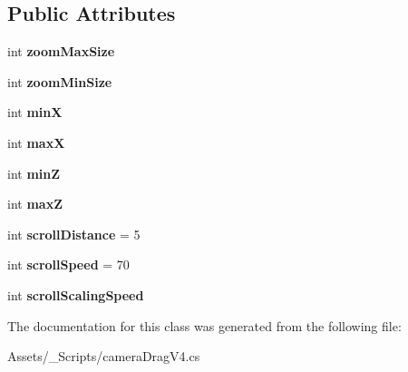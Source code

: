 \subsection*{Public Attributes}
\begin{DoxyCompactItemize}
\item 
\hypertarget{classcamera_drag_v4_a80f8856241afcd5c2f165eaf5c40929f}{}int {\bfseries zoom\+Max\+Size}\label{classcamera_drag_v4_a80f8856241afcd5c2f165eaf5c40929f}

\item 
\hypertarget{classcamera_drag_v4_a82e328f5ca7388c79bd4ac16ef284a8c}{}int {\bfseries zoom\+Min\+Size}\label{classcamera_drag_v4_a82e328f5ca7388c79bd4ac16ef284a8c}

\item 
\hypertarget{classcamera_drag_v4_a514fb1fd0d0e31048c91dac30029cb8f}{}int {\bfseries min\+X}\label{classcamera_drag_v4_a514fb1fd0d0e31048c91dac30029cb8f}

\item 
\hypertarget{classcamera_drag_v4_aaadeccba5dd760e761724fe92ca99f6c}{}int {\bfseries max\+X}\label{classcamera_drag_v4_aaadeccba5dd760e761724fe92ca99f6c}

\item 
\hypertarget{classcamera_drag_v4_a164102ae02bf95a3f6250f0fcc2393f2}{}int {\bfseries min\+Z}\label{classcamera_drag_v4_a164102ae02bf95a3f6250f0fcc2393f2}

\item 
\hypertarget{classcamera_drag_v4_a09d6958647698f6d211b696ce21e865b}{}int {\bfseries max\+Z}\label{classcamera_drag_v4_a09d6958647698f6d211b696ce21e865b}

\item 
\hypertarget{classcamera_drag_v4_a0f75833bc85122ab7a88f7e443842090}{}int {\bfseries scroll\+Distance} = 5\label{classcamera_drag_v4_a0f75833bc85122ab7a88f7e443842090}

\item 
\hypertarget{classcamera_drag_v4_a8af87ef0c3dde602cc6c4e70546209db}{}int {\bfseries scroll\+Speed} = 70\label{classcamera_drag_v4_a8af87ef0c3dde602cc6c4e70546209db}

\item 
\hypertarget{classcamera_drag_v4_a091bce69104ddbf27fbb896b7188cdbc}{}int {\bfseries scroll\+Scaling\+Speed}\label{classcamera_drag_v4_a091bce69104ddbf27fbb896b7188cdbc}

\end{DoxyCompactItemize}


The documentation for this class was generated from the following file\+:\begin{DoxyCompactItemize}
\item 
Assets/\+\_\+\+Scripts/camera\+Drag\+V4.\+cs\end{DoxyCompactItemize}
